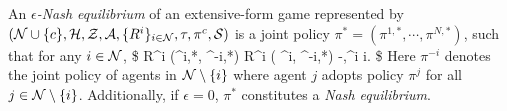 \begin{definition}\label{def:extens_NE}
	An \emph{$\epsilon$-Nash equilibrium} of an extensive-form game represented by $(\mathcal{N}\cup \{c\},\mathcal{H},\mathcal{Z},\\\mathcal{A}, \{ R^i\}_{i \in \mathcal{N}},\tau,\pi^c,{\mathcal{S}})$  is a joint policy $\pi^*=(\pi^{1,*},\cdots,\pi^{N,*})$, such that for any 
	$i\in\mathcal{N}$, 
	\$
	R^i (\pi^{i,*}, \pi^{-i,*})  \geq R^i ( \pi^i, \pi^{-i,*}) 
	 -\epsilon,\quad{}\pi^i i.
	\$
	 Here   $\pi ^{-i}$ denotes the joint policy of    agents in  $\mathcal{N} \setminus \{ i\} $ where agent $j$ adopts policy $\pi^j$ for all $j \in  \mathcal{N} \setminus \{ i\}$.  Additionally, if $\epsilon=0$, $\pi^*$ constitutes a \emph{Nash equilibrium}. 
\end{definition}

